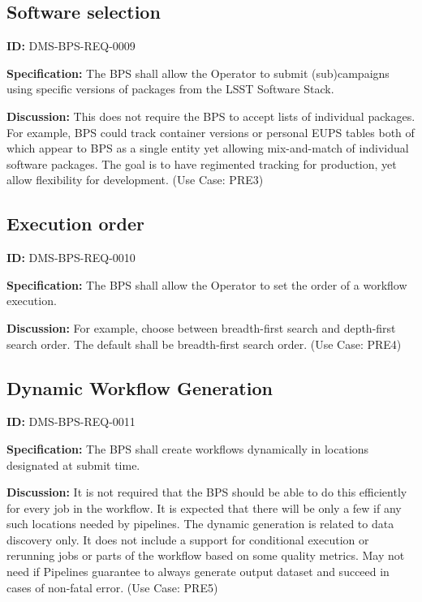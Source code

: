 \documentclass[SE,toc]{lsstdoc}
\begin{document}
\subsection{Software selection}

\label{DMS-BPS-REQ-0009}
\textbf{ID:} DMS-BPS-REQ-0009

\textbf{Specification:}
The BPS shall allow the Operator to submit (sub)campaigns using specific versions of packages from the LSST Software Stack.

\textbf{Discussion:}
This does not require the BPS to accept lists of individual packages. For example, BPS could track container versions or personal EUPS tables both of which appear to BPS as a single entity yet allowing mix-and-match of individual software packages. The goal is to have regimented tracking for production, yet allow flexibility for development.  (Use Case: PRE3)

\subsection{Execution order}

\label{DMS-BPS-REQ-0010}
\textbf{ID:} DMS-BPS-REQ-0010

\textbf{Specification:}
The BPS shall allow the Operator to set the order of a workflow execution.

\textbf{Discussion:}
For example, choose between breadth-first search and depth-first search order. The default shall be breadth-first search order.  (Use Case: PRE4)

\subsection{Dynamic Workflow Generation}

\label{DMS-BPS-REQ-0011}
\textbf{ID:} DMS-BPS-REQ-0011

\textbf{Specification:}
The BPS shall create workflows dynamically in locations designated at submit time.

\textbf{Discussion:}
It is not required that the BPS should be able to do this efficiently for every job in the workflow. It is expected that there will be only a few if any such locations needed by pipelines. The dynamic generation is related to data discovery only. It does not include a support for conditional execution or rerunning jobs or parts of the workflow based on some quality metrics.  May not need if Pipelines guarantee to always generate output dataset and succeed in cases of non-fatal error.  (Use Case: PRE5)
\end{document}
